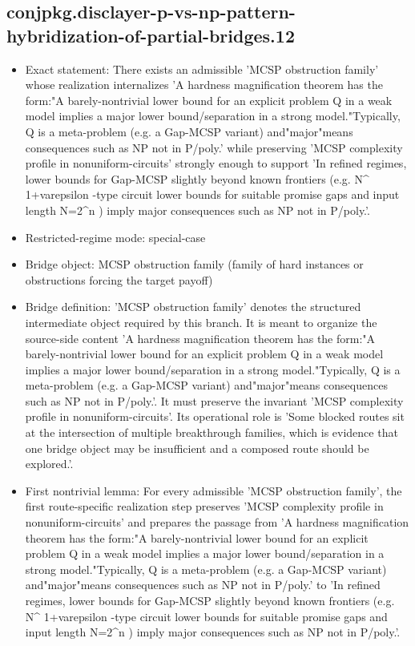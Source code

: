 \documentclass[11pt]{article}
\begin{document}
\subsection*{conjpkg.disclayer-p-vs-np-pattern-hybridization-of-partial-bridges.12}
\begin{itemize}
\item Exact statement: There exists an admissible 'MCSP obstruction family' whose realization internalizes 'A hardness magnification theorem has the form:"A barely-nontrivial lower bound for an explicit problem Q in a weak model implies a major lower bound/separation in a strong model."Typically, Q is a meta-problem (e.g. a Gap-MCSP variant) and"major"means consequences such as NP not in P/poly.' while preserving 'MCSP complexity profile in nonuniform-circuits' strongly enough to support 'In refined regimes, lower bounds for Gap-MCSP slightly beyond known frontiers (e.g. N\textasciicircum{} 1+varepsilon -type circuit lower bounds for suitable promise gaps and input length N=2\textasciicircum{}n ) imply major consequences such as NP not in P/poly.'.
\item Restricted-regime mode: special-case
\item Bridge object: MCSP obstruction family (family of hard instances or obstructions forcing the target payoff)
\item Bridge definition: 'MCSP obstruction family' denotes the structured intermediate object required by this branch. It is meant to organize the source-side content 'A hardness magnification theorem has the form:"A barely-nontrivial lower bound for an explicit problem Q in a weak model implies a major lower bound/separation in a strong model."Typically, Q is a meta-problem (e.g. a Gap-MCSP variant) and"major"means consequences such as NP not in P/poly.'. It must preserve the invariant 'MCSP complexity profile in nonuniform-circuits'. Its operational role is 'Some blocked routes sit at the intersection of multiple breakthrough families, which is evidence that one bridge object may be insufficient and a composed route should be explored.'.
\item First nontrivial lemma: For every admissible 'MCSP obstruction family', the first route-specific realization step preserves 'MCSP complexity profile in nonuniform-circuits' and prepares the passage from 'A hardness magnification theorem has the form:"A barely-nontrivial lower bound for an explicit problem Q in a weak model implies a major lower bound/separation in a strong model."Typically, Q is a meta-problem (e.g. a Gap-MCSP variant) and"major"means consequences such as NP not in P/poly.' to 'In refined regimes, lower bounds for Gap-MCSP slightly beyond known frontiers (e.g. N\textasciicircum{} 1+varepsilon -type circuit lower bounds for suitable promise gaps and input length N=2\textasciicircum{}n ) imply major consequences such as NP not in P/poly.'.

\end{itemize}
\end{document}
